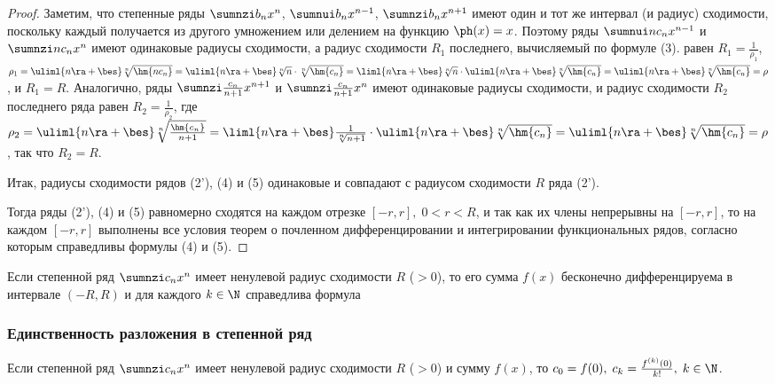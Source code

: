 \documentclass[a4paper]{article}
\begin{document}
\begin{proof}
Заметим, что степенные ряды $\sumnzi b_nx^n$, $\sumnui b_nx^{n-1}$,
$\sumnzi b_nx^{n+1}$ имеют один и тот же интервал (и радиус)
сходимости, поскольку каждый получается из другого умножением или
делением на функцию $\ph(x)=x$. Поэтому ряды $\sumnui nc_n x^{n-1}$
и $\sumnzi nc_nx^n$ имеют одинаковые радиусы сходимости, а радиус
сходимости $R_1$ последнего, вычисляемый по формуле (3). равен $R_1
= \frac1{\rho_1}$, $\rho_1 = \uliml{n\ra+\bes} \sqrt[n]{\hm{nc_n}} =
\uliml{n\ra+\bes} \sqrt[n]{n} \cdot \sqrt[n]{\hm{c_n}} =
\liml{n\ra+\bes} \sqrt[n]{n} \cdot \uliml{n\ra+\bes}
\sqrt[n]{\hm{c_n}} = \uliml{n\ra+\bes} \sqrt[n]{\hm{c_n}} = \rho$, и
$R_1=R$. Аналогично, ряды $\sumnzi \frac{c_n}{n+1} x^{n+1}$ и
$\sumnzi \frac{c_n}{n+1}x^n$ имеют одинаковые радиусы сходимости, и
радиус сходимости $R_2$ последнего ряда равен $R_2 =
\frac1{\rho_2}$, где $\rho_2 = \uliml{n\ra+\bes}
\sqrt[n]{\frac{\hm{c_n}}{n+1}} = \liml{n\ra+\bes}
\frac1{\sqrt[n]{n+1}} \cdot \uliml{n\ra+\bes} \sqrt[n]{\hm{c_n}} =
\uliml{n\ra+\bes} \sqrt[n]{\hm{c_n}} = \rho$, так что $R_2=R$.

Итак, радиусы сходимости рядов (2'), (4) и (5) одинаковые и
совпадают с радиусом сходимости $R$ ряда (2').

Тогда ряды (2'), (4) и (5) равномерно сходятся на каждом отрезке
$[-r,r], \; 0<r<R$, и так как их члены непрерывны на $[-r,r]$, то на
каждом $[-r,r]$ выполнены все условия теорем о почленном
дифференцировании и интегрировании функциональных рядов, согласно
которым справедливы формулы (4) и (5).
\end{proof}

\begin{imp}
Если степенной ряд $\sumnzi c_nx^n$ имеет ненулевой радиус
сходимости $R$ ($>0$), то его сумма $f(x)$ бесконечно
дифференцируема в интервале $(-R,R)$ и для каждого $k\in\N$
справедлива формула 
\end{imp}

\subsubsection{Единственность разложения в степенной ряд}

\begin{theorem}
Если степенной ряд $\sumnzi c_nx^n$ имеет ненулевой радиус
сходимости $R$ ($>0$) и сумму $f(x)$, то $c_0=f(0), \; c_k =
\frac{f^{(k)}(0)}{k!}, \; k\in\N$.
\end{theorem}
\end{document}

